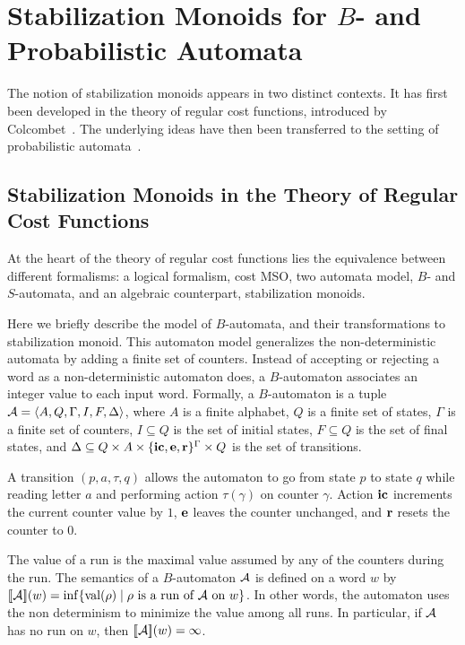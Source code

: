 \section{Stabilization Monoids for $B$- and Probabilistic Automata}

The notion of stabilization monoids appears in two distinct contexts.
It has first been developed in the theory of regular cost functions,
introduced by Colcombet~\cite{Colcombet09,Colcombet13}.
The underlying ideas have then been transferred to the setting of probabilistic automata~\cite{FGO12}.

\subsection{Stabilization Monoids in the Theory of Regular Cost Functions}

At the heart of the theory of regular cost functions lies the equivalence between different formalisms:
a logical formalism, cost MSO, two automata model, $B$- and $S$-automata, and an algebraic counterpart, stabilization monoids.

Here we briefly describe the model of $B$-automata, and their transformations to stabilization monoid.
This automaton model generalizes the non-deterministic automata by adding a finite set of counters.
Instead of accepting or rejecting a word as a non-deterministic automaton does, 
a $B$-automaton associates an integer value to each input word.
Formally, a $B$-automaton is a tuple $\mathcal{A} = \langle A,Q,\Gamma,I,F,\Delta \rangle$, where $A$ is a finite alphabet, $Q$ is a finite set of states, 
$\Gamma$ is a finite set of counters, $I \subseteq Q$ is the set of initial states, $F \subseteq Q$ is the set of final states, 
and $\Delta \subseteq Q \times A \times \{ \mathbf{ic},\mathbf{e},\mathbf{r} \}^\Gamma \times Q$ is the set of transitions.

A transition $(p,a,\tau,q)$ allows the automaton to go from state $p$ to state $q$ while reading letter $a$ and performing action $\tau(\gamma)$ on counter $\gamma$. 
Action $\mathbf{ic}$ increments the current counter value by $1$, $\mathbf{e}$ leaves the counter unchanged, and $\mathbf{r}$ resets the counter to $0$.

The value of a run is the maximal value assumed by any of the counters during the run.
The semantics of a $B$-automaton $\mathcal{A}$ is defined on a word $w$ by 
$[\![\mathcal{A}]\!](w) = \inf\{ \mathrm{val}(\rho) \mid \rho\text{ is a run of } \mathcal{A} \text{ on } w \}$.
In other words, the automaton uses the non determinism to minimize the value among all runs.
In particular, if $\mathcal{A}$ has no run on $w$, then $[\![\mathcal{A}]\!](w) = \infty$.

